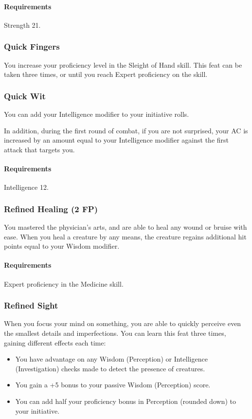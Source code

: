     \paragraph{Requirements} Strength 21.
\subsubsection{Quick Fingers} \label{feat::quickfingers}
    You increase your proficiency level in the Sleight of Hand skill.
    This feat can be taken three times, or until you reach Expert proficiency on the skill.
\subsubsection{Quick Wit} \label{feat::quickwit}
    You can add your Intelligence modifier to your initiative rolls.

    In addition, during the first round of combat, if you are not surprised, your AC is increased by an amount equal to your Intelligence modifier against the first attack that targets you.
    \paragraph{Requirements} Intelligence 12.
\subsubsection{Refined Healing (2 FP)} \label{feat::refinedhealing}
    You mastered the physician's arts, and are able to heal any wound or bruise with ease.
    When you heal a creature by any means, the creature regains additional hit points equal to your Wisdom modifier.
    \paragraph{Requirements} Expert proficiency in the Medicine skill.
\subsubsection{Refined Sight} \label{feat::refinedsight}
    When you focus your mind on something, you are able to quickly perceive even the smallest details and imperfections.
    You can learn this feat three times, gaining different effects each time:
    \begin{itemize}
        \item You have advantage on any Wisdom (Perception) or Intelligence (Investigation) checks made to detect the presence of creatures.
        \item You gain a +5 bonus to your passive Wisdom (Perception) score.
        \item You can add half your proficiency bonus in Perception (rounded down) to your initiative.
    \end{itemize}
